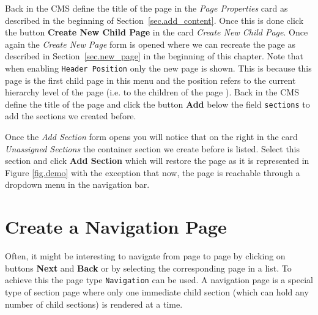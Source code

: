 \documentclass[a4paper,oneside]{book}
\begin{document}
Back in the CMS define the title of the page in the \emph{Page Properties} card as described in the beginning of Section~\ref{sec.add_content}.
Once this is done click the button \textbf{Create New Child Page} in the card \emph{Create New Child Page}.
Once again the \emph{Create New Page} form is opened where we can recreate the page  as described in Section~\ref{sec.new_page} in the beginning of this chapter.
Note that when enabling \texttt{Header Position} only the new page is shown.
This is because this page is the first child page in this menu and the position refers to the current hierarchy level of the page (i.e. to the children of the page ).
Back in the CMS define the title of the page and click the button \textbf{Add} below the field \texttt{sections} to add the sections we created before.

Once the \emph{Add Section} form opens you will notice that on the right in the card \emph{Unassigned Sections} the container section we create before is listed.
Select this section and click \textbf{Add Section} which will restore the page as it is represented in Figure \ref{fig.demo} with the exception that now, the page is reachable through a dropdown menu in the navigation bar.

\section{Create a Navigation Page}
Often, it might be interesting to navigate from page to page by clicking on buttons \textbf{Next} and \textbf{Back} or by selecting the corresponding page in a list.
To achieve this the page type \texttt{Navigation} can be used.
A navigation page is a special type of section page where only one immediate child section (which can hold any number of child sections) is rendered at a time.
\end{document}
